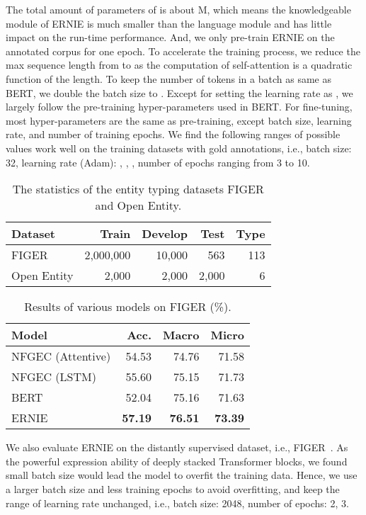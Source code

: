 \documentclass[11pt,a4paper]{article}
\begin{document}
The total amount of parameters of  is about M, which means the knowledgeable module of ERNIE is much smaller than the language module and has little impact on the run-time performance. And, we only pre-train ERNIE on the annotated corpus for one epoch. To accelerate the training process, we reduce the max sequence length from  to  as the computation of self-attention is a quadratic function of the length. To keep the number of tokens in a batch as same as BERT, we double the batch size to . Except for setting the learning rate as , we largely follow the pre-training hyper-parameters used in BERT.
For fine-tuning, most hyper-parameters are the same as pre-training, except batch size, learning rate, and number of training epochs. We find the following ranges of possible values work well on the training datasets with gold annotations, i.e., batch size: 32, learning rate (Adam): , , , number of epochs ranging from 3 to 10.



\begin{table}[t]
\centering
\scriptsize
\begin{tabular}{l|rrrr}
  \toprule
  Dataset & Train & Develop & Test &Type\\
  \midrule
  FIGER & 2,000,000 & 10,000 & 563 & 113\\
  Open Entity & 2,000 & 2,000 & 2,000 & 6\\
  \bottomrule
\end{tabular}
\caption{The statistics of the entity typing datasets FIGER and Open Entity.}
\label{tab-typing}
\end{table}

\begin{table}[t]
\scriptsize
\centering
\begin{tabular}{l|rrr}
  \toprule
  Model & Acc.& Macro & Micro\\
  \midrule
NFGEC (Attentive) & 54.53 & 74.76 & 71.58 \\
  NFGEC (LSTM) & 55.60 & 75.15 & 71.73 \\
  BERT & 52.04 & 75.16 & 71.63 \\
  \midrule
  ERNIE & \textbf{57.19} & \textbf{76.51} & \textbf{73.39} \\
  \bottomrule
\end{tabular}
\caption{Results of various models on FIGER (\%).}
\label{tab-et-result}
\vspace{-3mm}
\end{table}


We also evaluate ERNIE on the distantly supervised dataset, i.e., FIGER~\cite{ling2015design}. As the powerful expression ability of deeply stacked Transformer blocks, we found small batch size would lead the model to overfit the training data. Hence, we use a larger batch size and less training epochs to avoid overfitting, and keep the range of learning rate unchanged, i.e., batch size: 2048, number of epochs: 2, 3.
\end{document}
